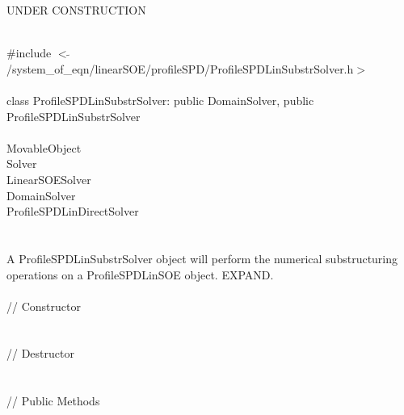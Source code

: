 
UNDER CONSTRUCTION

   \\
\indent \#include $<\tilde{
}$/system\_of\_eqn/linearSOE/profileSPD/ProfileSPDLinSubstrSolver.h$>$ \\ 

  \\
\indent class ProfileSPDLinSubstrSolver: public DomainSolver, public
ProfileSPDLinSubstrSolver  \\ 

 \\
\indent  MovableObject \\
\indent\indent  Solver \\
\indent\indent\indent  LinearSOESolver \\
\indent\indent\indent\indent  DomainSolver \\
\indent\indent\indent\indent  ProfileSPDLinDirectSolver \\
\indent\indent\indent\indent{} \\

  \\
\indent A ProfileSPDLinSubstrSolver object will perform the numerical
substructuring operations on a ProfileSPDLinSOE object. EXPAND. \\

  \\
\indent\indent // Constructor  \\
\indent{}  \\ \\
\indent\indent // Destructor  \\
\indent{}\\ \\
\indent\indent // Public Methods \\
\indent{} \\
\indent{} \\
\indent{} \\
\indent{} \\
\indent{} \\
\indent{} \\
\indent{} \\
\indent{} \\







